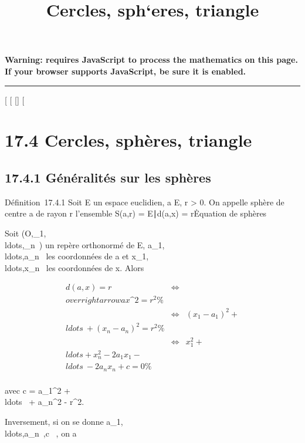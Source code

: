 \documentclass[]{article}
\title{Cercles, sph`eres, triangle}
\author{}
\date{}
\begin{document}
\maketitle

\textbf{Warning: 
requires JavaScript to process the mathematics on this page.\\ If your
browser supports JavaScript, be sure it is enabled.}

\begin{center}\rule{3in}{0.4pt}\end{center}

[
[
[]
[

\section{17.4 Cercles, sphères, triangle}

\subsection{17.4.1 Généralités sur les sphères}

Définition~17.4.1 Soit E un espace euclidien, a \in E, r > 0.
On appelle sphère de centre a de rayon r l'ensemble S(a,r) =
\x \in E∣d(a,x) =
r\.

Equation de sphères

Soit
(O,\vece_1,\\ldots,\vece_n~)
un repère orthonormé de E,
a_1,\\ldots,a_n~
les coordonnées de a et
x_1,\\ldots,x_n~
les coordonnées de x. Alors

\begin{align*} d(a,x) = r&
\Leftrightarrow &
\\overrightarrowax\^2
= r^2 \%& \\ &
\Leftrightarrow & (x_1 -
a_1)^2 +
\\ldots~ +
(x_ n - a_n)^2 = r^2 \%&
\\ & \Leftrightarrow &
x_1^2 +
\\ldots + x_
n^2 - 2a_ 1x_1
-\\ldots~ -
2a_nx_n + c = 0\%& \\
\end{align*}

avec c = a_1^2 +
\\ldots~ +
a_n^2 - r^2.

Inversement, si on se donne
a_1,\\ldots,a_n~,c
\in {}~, on a
\end{document}
